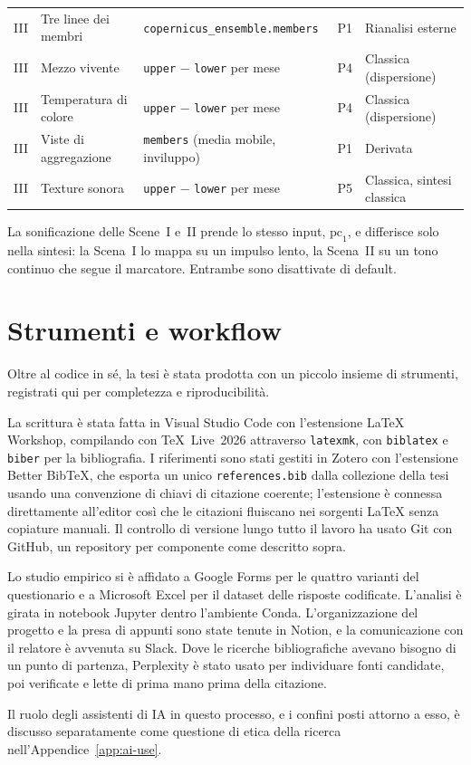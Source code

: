 \begin{table}[tbp]
\begin{tabularx}{\textwidth}{@{}p{1.2cm} X p{3.4cm} p{1.1cm} X@{}}
\addlinespace
III & Tre linee dei membri & \texttt{copernicus\_ensemble.members} & P1 & Rianalisi esterne \\
III & Mezzo vivente & \texttt{upper} $-$ \texttt{lower} per mese & P4 & Classica (dispersione) \\
III & Temperatura di colore & \texttt{upper} $-$ \texttt{lower} per mese & P4 & Classica (dispersione) \\
III & Viste di aggregazione & \texttt{members} (media mobile, inviluppo) & P1 & Derivata \\
III & Texture sonora & \texttt{upper} $-$ \texttt{lower} per mese & P5 & Classica, sintesi classica \\
\bottomrule
\end{tabularx}
\end{table}

\noindent La sonificazione delle Scene~I e~II prende lo stesso input, $\mathrm{pc}_1$, e
differisce solo nella sintesi: la Scena~I lo mappa su un impulso lento, la Scena~II su un tono
continuo che segue il marcatore. Entrambe sono disattivate di default.

\section{Strumenti e workflow}
\label{app:c-tools}

Oltre al codice in sé, la tesi è stata prodotta con un piccolo insieme di strumenti, registrati qui
per completezza e riproducibilità.

La scrittura è stata fatta in Visual Studio Code con l'estensione LaTeX Workshop, compilando con
\TeX{}~Live~2026 attraverso \texttt{latexmk}, con \texttt{biblatex} e \texttt{biber} per la
bibliografia. I riferimenti sono stati gestiti in Zotero con l'estensione Better BibTeX, che esporta
un unico \texttt{references.bib} dalla collezione della tesi usando una convenzione di chiavi di
citazione coerente; l'estensione è connessa direttamente all'editor così che le citazioni fluiscano
nei sorgenti \LaTeX{} senza copiature manuali. Il controllo di versione lungo tutto il lavoro ha
usato Git con GitHub, un repository per componente come descritto sopra.

Lo studio empirico si è affidato a Google Forms per le quattro varianti del questionario e a
Microsoft Excel per il dataset delle risposte codificate. L'analisi è girata in notebook Jupyter
dentro l'ambiente Conda. L'organizzazione del progetto e la presa di appunti sono state tenute in
Notion, e la comunicazione con il relatore è avvenuta su Slack. Dove le ricerche bibliografiche
avevano bisogno di un punto di partenza, Perplexity è stato usato per individuare fonti candidate, poi
verificate e lette di prima mano prima della citazione.

Il ruolo degli assistenti di IA in questo processo, e i confini posti attorno a esso, è discusso
separatamente come questione di etica della ricerca nell'Appendice~\ref{app:ai-use}.

